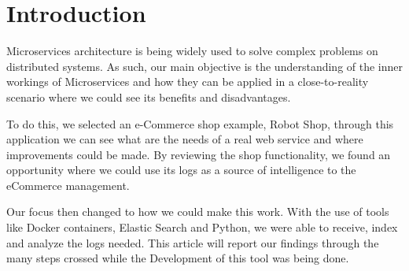 \section{Introduction}

Microservices architecture is being widely used to solve complex problems on distributed systems. As such, our main objective is the understanding of the inner workings of Microservices and how they can be applied in a close-to-reality scenario where we could see its benefits and disadvantages.

To do this, we selected an e-Commerce shop example, Robot Shop, through this application we can see what are the needs of a real web service and where improvements could be made. By reviewing the shop functionality, we found an opportunity where we could use its logs as a source of intelligence to the eCommerce management.

Our focus then changed to how we could make this work. With the use of tools like Docker containers, Elastic Search and Python, we were able to receive, index and analyze the logs needed. This article will report our findings through the many steps crossed while the Development of this tool was being done.